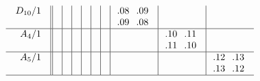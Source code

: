 \documentclass[12pt,a4paper]{amsart}
\begin{document}
\begin{align*}
\begin{array}{r||c|c|c|c|c|c|c|c|c}
\begin{array}{r}
      D_{10}/1 \\ \\
    \end{array}
&&&&&&&
    \begin{array}{cc}
\llap.08&\llap.09\\
\llap.09&\llap.08\\
    \end{array}
&& \\\hline
    \begin{array}{r}
      A_4/1 \\ \\
    \end{array}
&&&&&&&&
    \begin{array}{cc}
\llap.10&\llap.11\\
\llap.11&\llap.10\\
    \end{array}
& \\\hline
    \begin{array}{r}
      A_5/1 \\ \\
    \end{array}
&&&&&&&&&
    \begin{array}{cc}
\llap.12&\llap.13\\
\llap.13&\llap.12\\
    \end{array}
 \\\hline
  \end{array}
\end{align*}
\end{document}
